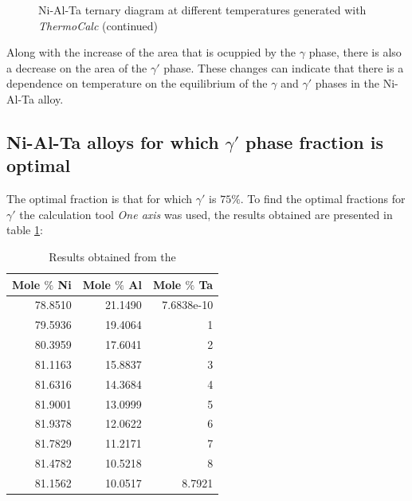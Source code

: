 \begin{figure}[H]
{    }
  \caption[]{\centering Ni-Al-Ta ternary diagram at different temperatures generated with \textit{ThermoCalc} \citep{thermocalc} (continued)}
\end{figure}

Along with the increase of the area that is ocuppied by the $\gamma$ phase, there is also a decrease on the area of the $\gamma'$ phase. These changes can indicate that there is a dependence on temperature on the equilibrium of the $\gamma$ and $\gamma'$ phases in the Ni-Al-Ta alloy.


\newpage
\subsection{Ni-Al-Ta alloys for which $\gamma'$ phase fraction is optimal}

The optimal fraction is that for which $\gamma'$ is $75\%$. To find the optimal fractions for $\gamma'$ the calculation tool \textit{One axis} was used, the results obtained are presented in table \ref{tab:tab02}:

\begin{table}[h]
  \centering
    \begin{tabular}{rrr}
        \multicolumn{1}{c}{\textbf{Mole $\%$ Ni}} & \multicolumn{1}{c}{\textbf{Mole $\%$ Al}} & \multicolumn{1}{c}{\textbf{Mole $\%$ Ta}} \\ \hline \hline
        78.8510 & 21.1490 & 7.6838e-10 \\
        79.5936 & 19.4064 & 1 \\
        80.3959 & 17.6041 & 2 \\
        81.1163 & 15.8837 & 3 \\
        81.6316 & 14.3684 & 4 \\
        81.9001 & 13.0999 & 5 \\
        81.9378 & 12.0622 & 6 \\
        81.7829 & 11.2171 & 7 \\
        81.4782 & 10.5218 & 8 \\
        81.1562 & 10.0517 & 8.7921
    \end{tabular}
  \caption{Results obtained from the }
  \label{tab:tab02}
\end{table}

